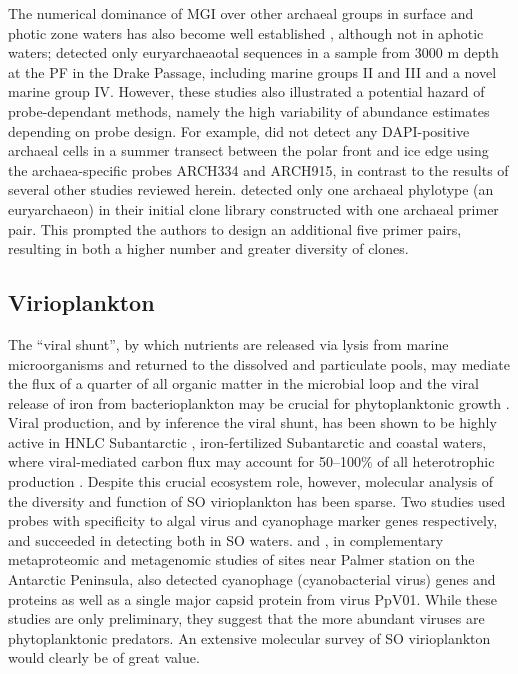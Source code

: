The numerical dominance of \ac{MGI} over other archaeal groups in surface and photic zone waters has also become well established \citep[e.g.][]{DeLong:1994id,Massana:2000bg}, although not in aphotic waters; \citet{LopezGarcia:2001vp} detected only euryarchaeaotal sequences in a sample from 3000 m depth at the \ac{PF} in the Drake Passage, including marine groups II and III and a novel marine group IV.
However, these studies also illustrated a potential hazard of probe-dependant methods, namely the high variability of abundance estimates depending on probe design.
For example, \cite{Simon:1999ux} did not detect any DAPI-positive archaeal cells in a summer transect between the polar front and ice edge using the archaea-specific probes ARCH334 and ARCH915, in contrast to the results of several other studies reviewed herein.
\citet{LopezGarcia:2001vp} detected only one archaeal phylotype (an euryarchaeon) in their initial clone library constructed with one archaeal primer pair.
This prompted the authors to design an additional five primer pairs, resulting in both a higher number and greater diversity of clones.

\subsection{Virioplankton}

The ``viral shunt'', by which nutrients are released via lysis from marine microorganisms and returned to the dissolved and particulate pools, may mediate the flux of a quarter of all organic matter in the microbial loop \cite{Wilhelm:1999ds} and the viral release of iron from bacterioplankton may be crucial for phytoplanktonic growth \cite{Poorvin:2004vo}.
Viral production, and by inference the viral shunt, has been shown to be highly active in \ac{HNLC} Subantarctic \cite{Evans:2009ex}, iron-fertilized Subantarctic \cite{Weinbauer:2009tl} and coastal waters, where viral-mediated carbon flux may account for 50--100\% of all heterotrophic production \cite{GuixaBoixereu:2002vh}.
Despite this crucial ecosystem role, however, molecular analysis of the diversity and function of \ac{SO} virioplankton has been sparse.
Two studies \cite{Short:2002kk,Short:2005df} used probes with specificity to algal virus and cyanophage marker genes respectively, and succeeded in detecting both in \ac{SO} waters.
\cite{Williams:2012bs} and \cite{Grzymski:2012ej}, in complementary metaproteomic and metagenomic studies of sites near Palmer station on the Antarctic Peninsula, also detected cyanophage (cyanobacterial virus) genes and proteins as well as a single major capsid protein from  virus PpV01.
While these studies are only preliminary, they suggest that the more abundant viruses are phytoplanktonic predators.
An extensive molecular survey of SO virioplankton \citep[in the nature of][]{Angly:2006wf} would clearly be of great value.

